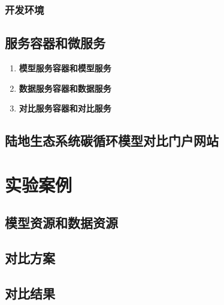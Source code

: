\subsubsection{开发环境}


\subsection{服务容器和微服务}
\begin{enumerate}[(1)]
    \item \textbf{模型服务容器和模型服务}
    \item \textbf{数据服务容器和数据服务}
    \item \textbf{对比服务容器和对比服务}
\end{enumerate}
\subsection{陆地生态系统碳循环模型对比门户网站}

\section{实验案例}
\subsection{模型资源和数据资源}
\subsection{对比方案}
\subsection{对比结果}
